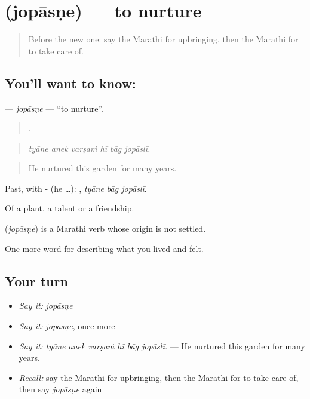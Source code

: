 \section[\texorpdfstring{\mr{जोपासणे} (jopāsṇe)}{जोपासणे (jopāsṇe)}]{ (jopāsṇe) — to nurture}

\label{lesson:MR-C500-jopasne}



\begin{quote}
Before the new one: say the Marathi for upbringing, then the Marathi for to take care of.
\end{quote}

\subsection*{You'll want to know: }
\textbf{} — \emph{jopāsṇe} — \textquotedblleft{}to nurture\textquotedblright{}.

\begin{quote}
     .
\end{quote}

\begin{quote}
\emph{tyāne anek varṣaṁ hī bāg jopāslī.}
\end{quote}

\begin{quote}
He nurtured this garden for many years.
\end{quote}

Past, with - (he …):   , \emph{tyāne bāg jopāslī}.

Of a plant, a talent or a friendship.

\begin{cousinweb}
\textbf{} (\emph{jopāsṇe}) is a Marathi verb whose origin is not settled.
\end{cousinweb}

\begin{grammarlens}[title={What you've built}]
One more word for describing what you lived and felt.
\end{grammarlens}

\subsection*{Your turn}
\begin{itemize}
\raggedright
  \item \emph{Say it:} \emph{jopāsṇe}
  \item \emph{Say it:} \emph{jopāsṇe}, once more
  \item \emph{Say it:} \emph{tyāne anek varṣaṁ hī bāg jopāslī.} — He nurtured this garden for many years.
  \item \emph{Recall:} say the Marathi for upbringing, then the Marathi for to take care of, then say \emph{jopāsṇe} again
\end{itemize}

